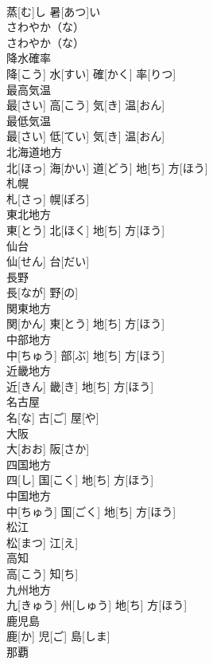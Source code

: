 \documentclass[8pt]{extreport}
\begin{document}
\begin{CJK}{UTF8}{min}
\\	蒸[む]し 暑[あつ]い		
\\	さわやか（な）	
\\	さわやか（な）		
\\	降水確率	
\\	降[こう] 水[すい] 確[かく] 率[りつ]		
\\	最高気温	
\\	最[さい] 高[こう] 気[き] 温[おん]		
\\	最低気温	
\\	最[さい] 低[てい] 気[き] 温[おん]		
\\	北海道地方	
\\	北[ほっ] 海[かい] 道[どう] 地[ち] 方[ほう]		
\\	札幌	
\\	札[さっ] 幌[ぽろ]		
\\	東北地方	
\\	東[とう] 北[ほく] 地[ち] 方[ほう]		
\\	仙台	
\\	仙[せん] 台[だい]		
\\	長野	
\\	長[なが] 野[の]		
\\	関東地方	
\\	関[かん] 東[とう] 地[ち] 方[ほう]		
\\	中部地方	
\\	中[ちゅう] 部[ぶ] 地[ち] 方[ほう]		
\\	近畿地方	
\\	近[きん] 畿[き] 地[ち] 方[ほう]		
\\	名古屋	
\\	名[な] 古[ご] 屋[や]		
\\	大阪	
\\	大[おお] 阪[さか]		
\\	四国地方	
\\	四[し] 国[こく] 地[ち] 方[ほう]		
\\	中国地方	
\\	中[ちゅう] 国[ごく] 地[ち] 方[ほう]		
\\	松江	
\\	松[まつ] 江[え]		
\\	高知	
\\	高[こう] 知[ち]		
\\	九州地方	
\\	九[きゅう] 州[しゅう] 地[ち] 方[ほう]		
\\	鹿児島	
\\	鹿[か] 児[ご] 島[しま]		
\\	那覇	

\end{CJK}
\end{document}
